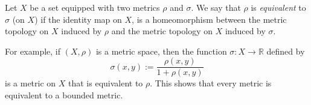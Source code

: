 \documentclass[12pt]{article}
\begin{document}
Let $X$ be a set equipped with two metrics $\rho$ and $\sigma$.  We say that $\rho$ is \emph{equivalent} to $\sigma$ (on $X$) if the identity map on $X$, is a homeomorphism between the metric topology on $X$ induced by $\rho$ and the metric topology on $X$ induced by $\sigma$.

For example, if $(X,\rho)$ is a metric space, then the function $\sigma: X\to \mathbb{R}$ defined by $$\sigma(x,y):=\frac{\rho(x,y)}{1+\rho(x,y)}$$
is a metric on $X$ that is equivalent to $\rho$.  This shows that every metric is equivalent to a bounded metric.

\end{document}
